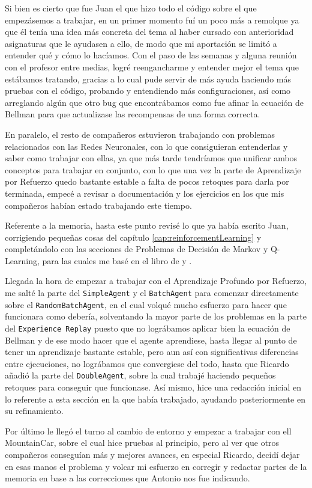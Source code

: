 Si bien es cierto que fue Juan el que hizo todo el código sobre el que empezásemos a trabajar, en un primer momento fuí un poco más a remolque ya que él tenía una idea más concreta del tema al haber cursado con anterioridad asignaturas que le ayudasen a ello, de modo que mi aportación se limitó a entender qué y cómo lo hacíamos. Con el paso de las semanas y alguna reunión con el profesor entre medias, logré reengancharme y entender mejor el tema que estábamos tratando, gracias a lo cual pude servir de más ayuda haciendo más pruebas con el código, probando y entendiendo más configuraciones, así como arreglando algún que otro bug que encontrábamos como fue afinar la ecuación de Bellman para que actualizase las recompensas de una forma correcta.

En paralelo, el resto de compañeros estuvieron trabajando con problemas relacionados con las Redes Neuronales, con lo que consiguieran entenderlas y saber como trabajar con ellas, ya que más tarde tendríamos que unificar ambos conceptos para trabajar en conjunto, con lo que una vez la parte de Aprendizaje por Refuerzo quedo bastante estable a falta de pocos retoques para darla por terminada, empecé a revisar a documentación y los ejercicios en los que mis compañeros habían estado trabajando este tiempo.

Referente a la memoria, hasta este punto revisé lo que ya había escrito Juan, corrigiendo pequeñas cosas del capítulo \ref{cap:reinforcementLearning} y completándolo con las secciones de Problemas de Decisión de Markov y Q-Learning, para las cuales me basé en el libro de \citet[cap. 9]{Buduma:general} y \citet{Watkins1992}.

Llegada la hora de empezar a trabajar con el Aprendizaje Profundo por Refuerzo, me salté la parte del \texttt{SimpleAgent} y el \texttt{BatchAgent} para comenzar directamente sobre el \texttt{RandomBatchAgent}, en el cual volqué mucho esfuerzo para hacer que funcionara como debería, solventando la mayor parte de los problemas en la parte del \texttt{Experience Replay} puesto que no lográbamos aplicar bien la ecuación de Bellman y de ese modo hacer que el agente aprendiese, hasta llegar al punto de tener un aprendizaje bastante estable, pero aun así con significativas diferencias entre ejecuciones, no lográbamos que convergiese del todo, hasta que Ricardo añadió la parte del \texttt{DoubleAgent}, sobre la cual trabajé haciendo pequeños retoques para conseguir que funcionase. Así mismo, hice una redacción inicial en lo referente a esta sección en la que había trabajado, ayudando posteriormente en su refinamiento.

Por último le llegó el turno al cambio de entorno y empezar a trabajar con ell MountainCar, sobre el cual hice pruebas al principio, pero al ver que otros compañeros conseguían más y mejores avances, en especial Ricardo, decidí dejar en esas manos el problema y volcar mi esfuerzo en corregir y redactar partes de la memoria en base a las correcciones que Antonio nos fue indicando.
